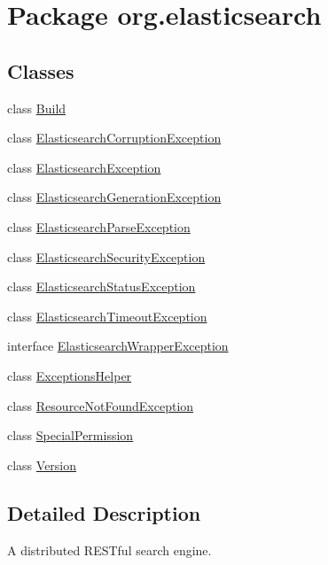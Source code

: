 \hypertarget{namespaceorg_1_1elasticsearch}{}\section{Package org.\+elasticsearch}
\label{namespaceorg_1_1elasticsearch}
\subsection*{Classes}
\begin{DoxyCompactItemize}
\item 
class \hyperlink{classorg_1_1elasticsearch_1_1_build}{Build}
\item 
class \hyperlink{classorg_1_1elasticsearch_1_1_elasticsearch_corruption_exception}{Elasticsearch\+Corruption\+Exception}
\item 
class \hyperlink{classorg_1_1elasticsearch_1_1_elasticsearch_exception}{Elasticsearch\+Exception}
\item 
class \hyperlink{classorg_1_1elasticsearch_1_1_elasticsearch_generation_exception}{Elasticsearch\+Generation\+Exception}
\item 
class \hyperlink{classorg_1_1elasticsearch_1_1_elasticsearch_parse_exception}{Elasticsearch\+Parse\+Exception}
\item 
class \hyperlink{classorg_1_1elasticsearch_1_1_elasticsearch_security_exception}{Elasticsearch\+Security\+Exception}
\item 
class \hyperlink{classorg_1_1elasticsearch_1_1_elasticsearch_status_exception}{Elasticsearch\+Status\+Exception}
\item 
class \hyperlink{classorg_1_1elasticsearch_1_1_elasticsearch_timeout_exception}{Elasticsearch\+Timeout\+Exception}
\item 
interface \hyperlink{interfaceorg_1_1elasticsearch_1_1_elasticsearch_wrapper_exception}{Elasticsearch\+Wrapper\+Exception}
\item 
class \hyperlink{classorg_1_1elasticsearch_1_1_exceptions_helper}{Exceptions\+Helper}
\item 
class \hyperlink{classorg_1_1elasticsearch_1_1_resource_not_found_exception}{Resource\+Not\+Found\+Exception}
\item 
class \hyperlink{classorg_1_1elasticsearch_1_1_special_permission}{Special\+Permission}
\item 
class \hyperlink{classorg_1_1elasticsearch_1_1_version}{Version}
\end{DoxyCompactItemize}


\subsection{Detailed Description}
A distributed R\+E\+S\+Tful search engine. 